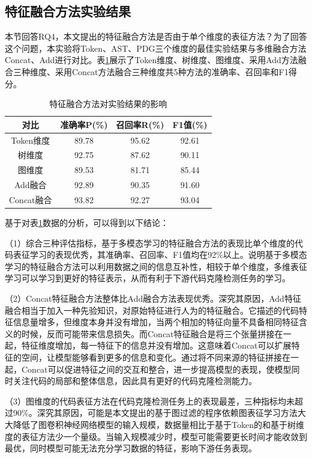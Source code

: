 \subsection{特征融合方法实验结果}

本节回答RQ4，本文提出的特征融合方法是否由于单个维度的表征方法？为了回答这个问题，本实验将Token、AST、PDG三个维度的最佳实验结果与多维融合方法Concat、Add进行对比。表\ref{tab:concat}展示了Token维度、树维度、图维度、采用Add方法融合三种维度、采用Concat方法融合三种维度共5种方法的准确率、召回率和F1得分。

\begin{table}[htp]
  \centering
  \caption{特征融合方法对实验结果的影响}
  \label{tab:concat}
  \begin{tabular*}{0.9\textwidth}{@{\extracolsep{\fill}}cccc}
  \toprule
    对比			& 准确率P(\%) & 召回率R(\%) & F1值(\%)  \\ 
  \midrule
    Token维度			   & 89.78	  & 95.62	  & 92.61	   \\  
    树维度		       & 92.75	  & 87.62	  & 90.11   \\ 
    图维度			     & 89.53		& 81.71		& 85.44   \\
    Add融合			     & 92.89		& 90.35		& 91.60   \\
    Concat融合     	 & 93.82		& 92.27		& 93.04  \\
  \bottomrule
  \end{tabular*}
\end{table}


基于对表\ref{tab:concat}数据的分析，可以得到以下结论：

（1）综合三种评估指标，基于多模态学习的特征融合方法的表现比单个维度的代码表征学习的表现优秀，其准确率、召回率、F1值均在92\%以上。说明基于多模态学习的特征融合方法可以利用数据之间的信息互补性，相较于单个维度，多维表征学习可以学习到更好的特征表示，从而有利于下游代码克隆检测任务的学习。

（2）Concat特征融合方法整体比Add融合方法表现优秀。深究其原因，Add特征融合相当于加入一种先验知识，对原始特征进行人为的特征融合。它描述的代码特征信息量增多，但维度本身并没有增加，当两个相加的特征向量不具备相同特征含义的时候，反而可能带来信息损失。而Concat特征融合是将三个张量拼接在一起，特征维度增加，每一特征下的信息并没有增加。这意味着Concat可以扩展特征的空间，让模型能够看到更多的信息和变化。通过将不同来源的特征拼接在一起，Concat可以促进特征之间的交互和整合，进一步提高模型的表现，使模型同时关注代码的局部和整体信息，因此具有更好的代码克隆检测能力。

（3）图维度的代码表征方法在代码克隆检测任务上的表现最差，三种指标均未超过90\%。深究其原因，可能是本文提出的基于图过滤的程序依赖图表征学习方法大大降低了图卷积神经网络模型的输入规模，数据量相比于基于Token的和基于树维度的表征方法少一个量级。当输入规模减少时，模型可能需要更长时间才能收敛到最优，同时模型可能无法充分学习数据的特征，影响下游任务表现。



